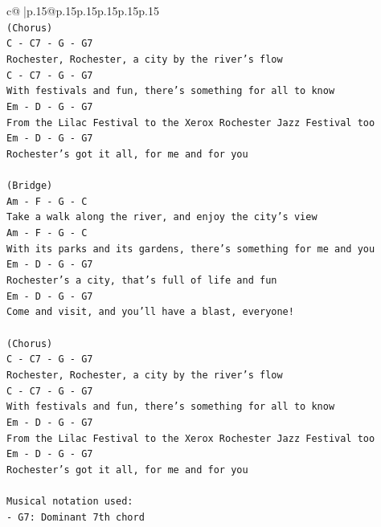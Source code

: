 \documentclass{article}
\begin{document}
{\begin{supertabular}{c@{$\;$}|p{.15\linewidth}@{}p{.15\linewidth}p{.15\linewidth}p{.15\linewidth}p{.15\linewidth}p{.15\linewidth}}
{{{\\ 
\texttt{(Chorus)} \\
\texttt{C {-} C7 {-} G {-} G7} \\
\texttt{Rochester, Rochester, a city by the river's flow} \\
\texttt{C {-} C7 {-} G {-} G7} \\
\texttt{With festivals and fun, there's something for all to know} \\
\texttt{Em {-} D {-} G {-} G7} \\
\texttt{From the Lilac Festival to the Xerox Rochester Jazz Festival too} \\
\texttt{Em {-} D {-} G {-} G7} \\
\texttt{Rochester's got it all, for me and for you} \\
\\ 
\texttt{(Bridge)} \\
\texttt{Am {-} F {-} G {-} C} \\
\texttt{Take a walk along the river, and enjoy the city's view} \\
\texttt{Am {-} F {-} G {-} C} \\
\texttt{With its parks and its gardens, there's something for me and you} \\
\texttt{Em {-} D {-} G {-} G7} \\
\texttt{Rochester's a city, that's full of life and fun} \\
\texttt{Em {-} D {-} G {-} G7} \\
\texttt{Come and visit, and you'll have a blast, everyone!} \\
\\ 
\texttt{(Chorus)} \\
\texttt{C {-} C7 {-} G {-} G7} \\
\texttt{Rochester, Rochester, a city by the river's flow} \\
\texttt{C {-} C7 {-} G {-} G7} \\
\texttt{With festivals and fun, there's something for all to know} \\
\texttt{Em {-} D {-} G {-} G7} \\
\texttt{From the Lilac Festival to the Xerox Rochester Jazz Festival too} \\
\texttt{Em {-} D {-} G {-} G7} \\
\texttt{Rochester's got it all, for me and for you} \\
\\ 
\texttt{Musical notation used:} \\
\texttt{{-} G7: Dominant 7th chord} \\
}}}
\end{supertabular}}
\end{document}
